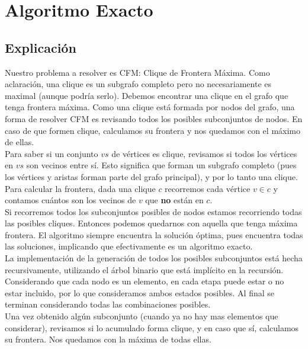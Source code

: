 
\section{Algoritmo Exacto}

\subsection{Explicación}

Nuestro problema a resolver es CFM: Clique de Frontera Máxima. Como aclaración, una clique es un subgrafo completo pero no necesariamente es maximal (aunque podría serlo). Debemos encontrar una clique en el grafo que tenga frontera máxima. Como una clique está formada por nodos del grafo, una forma de resolver CFM es revisando todos los posibles subconjuntos de nodos. En caso de que formen clique, calculamos su frontera y nos quedamos con el máximo de ellas.  \\

Para saber si un conjunto $vs$ de vértices es clique, revisamos si todos los vértices en $vs$ son vecinos entre sí. Esto significa que forman un subgrafo completo (pues los vértices y aristas forman parte del grafo principal), y por lo tanto una clique. \\

Para calcular la frontera, dada una clique $c$ recorremos cada vértice $v \in c$ y contamos cuántos son los vecinos de $v$ que \textbf{no} están en $c$. \\

Si recorremos todos los subconjuntos posibles de nodos estamos recorriendo todas las posibles cliques. Entonces podemos quedarnos con aquella que tenga máxima frontera. El algoritmo siempre encuentra la solución óptima, pues encuentra todas las soluciones, implicando que efectivamente es un algoritmo exacto. \\

La implementación de la generación de todos los posibles subconjuntos está hecha recursivamente, utilizando el árbol binario que está implícito en la recursión. Considerando que cada nodo es un elemento, en cada etapa puede estar o no estar incluido, por lo que consideramos ambos estados posibles. Al final se terminan considerando todas las combinaciones posibles. \\

Una vez obtenido algún subconjunto (cuando ya no hay mas elementos que considerar), revisamos si lo acumulado forma clique, y en caso que sí, calculamos su frontera. Nos quedamos con la máxima de todas ellas. \\

